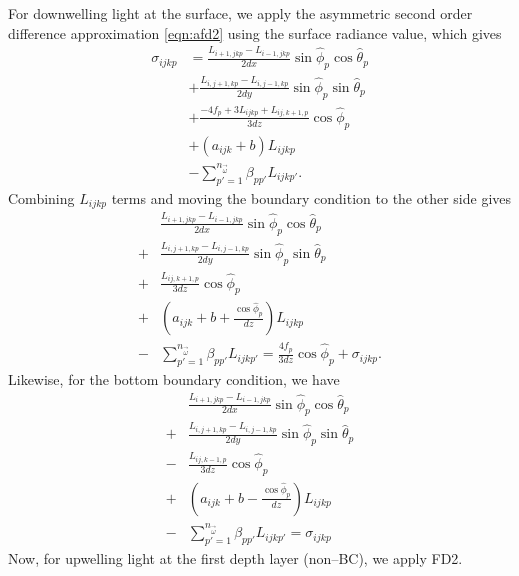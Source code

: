 For downwelling light at the surface, we apply the asymmetric second order difference approximation \eqref{eqn:afd2}
using the surface radiance value, which gives
\begin{equation*}
  \begin{aligned}
    \sigma_{ijkp} &= \frac{L_{i+1,jkp}-L_{i-1,jkp}}{2dx}\sin\hat{\phi}_p\cos\hat{\theta}_p \\
    &+ \frac{L_{i,j+1,kp}-L_{i,j-1,kp}}{2dy}\sin\hat{\phi}_p\sin\hat{\theta}_p \\
    &+ \frac{-4f_p + 3L_{ijkp} + L_{ij,k+1,p}}{3dz}\cos\hat{\phi}_p \\
    &+ (a_{ijk}+b)L_{ijkp} \\
    &- \sum_{p'=1}^{n_{\vec{\omega}}} \beta_{pp'} L_{ijkp'}.
  \end{aligned}
\end{equation*}
Combining $L_{ijkp}$ terms and moving the boundary condition to the other side gives
\begin{equation*}
  \begin{aligned}
    &\frac{L_{i+1,jkp}-L_{i-1,jkp}}{2dx}\sin\hat{\phi}_p\cos\hat{\theta}_p \\
    + &\frac{L_{i,j+1,kp}-L_{i,j-1,kp}}{2dy}\sin\hat{\phi}_p\sin\hat{\theta}_p \\
    + &\frac{L_{ij,k+1,p}}{3dz}\cos\hat{\phi}_p \\
    + &\left(a_{ijk}+b + \frac{\cos\hat{\phi}_p}{dz} \right) L_{ijkp} \\
    - &\sum_{p'=1}^{n_{\vec{\omega}}} \beta_{pp'} L_{ijkp'} = \frac{4f_p}{3dz} \cos\hat{\phi}_p + \sigma_{ijkp}.
  \end{aligned}
\end{equation*}
Likewise, for the bottom boundary condition, we have
\begin{equation*}
  \begin{aligned}
    &\frac{L_{i+1,jkp}-L_{i-1,jkp}}{2dx}\sin\hat{\phi}_p\cos\hat{\theta}_p \\
    + &\frac{L_{i,j+1,kp}-L_{i,j-1,kp}}{2dy}\sin\hat{\phi}_p\sin\hat{\theta}_p \\
    - &\frac{L_{ij,k-1,p}}{3dz}\cos\hat{\phi}_p \\
    + &\left(a_{ijk}+b - \frac{\cos\hat{\phi}_p}{dz} \right) L_{ijkp} \\
    - &\sum_{p'=1}^{n_{\vec{\omega}}} \beta_{pp'} L_{ijkp'} = \sigma_{ijkp}
  \end{aligned}
\end{equation*}
Now, for upwelling light at the first depth layer (non--BC), we apply FD2.
